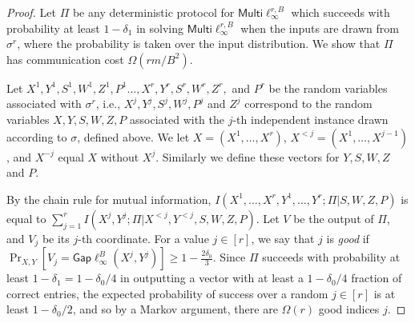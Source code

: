 \documentclass[twoside,leqno,twocolumn]{article}
\newcommand{\gaplinf}{\mathsf{Gap}\ell_{\infty}}
\newcommand{\multiLinf}{\mathsf{Multi}\ell_{\infty}}
\begin{document}
\begin{proof}
  Let $\Pi$ be any deterministic
  protocol for $\multiLinf^{r,B}$ which succeeds with probability at
  least $1-\delta_1$ in solving $\multiLinf^{r,B}$ when the inputs are
  drawn from $\sigma^r$, where the probability is taken over the input
  distribution. We show that $\Pi$ has communication cost
  $\Omega(rm/B^2)$.

  Let $X^1, Y^1, S^1, W^1, Z^1, P^1 \ldots, X^r, Y^r, S^r, W^r, Z^r,$ and $P^r$
  be the random variables associated with $\sigma^r$, i.e., 
  $X^j, Y^j, S^j, W^j, P^j$ and $Z^j$ correspond to the random variables
  $X, Y, S, W,Z,P$ associated with the $j$-th independent instance drawn
  according to $\sigma$, defined above. We let
  $X = (X^1, \ldots, X^r)$, $X^{< j} = (X^1, \ldots, X^{j-1})$, and
  $X^{-j}$ equal $X$ without $X^j$. Similarly we define these
  vectors for $Y, S, W, Z$ and $P$.
 
By the chain rule for mutual information, 
$I(X^1, \ldots, X^r, Y^1, \ldots, Y^r ; \Pi | S, W, Z, P)$
is equal to $\sum_{j=1}^r I(X^j, Y^j ; \Pi | X^{< j}, Y^{<j}, S, W, Z, P).$
Let $V$ be the output of $\Pi$, and $V_j$ be its $j$-th coordinate. 
For a value $j \in [r]$, we say that $j$ is {\it good} if
$\Pr_{X, Y}[V_j = \gaplinf^{B}(X^j, Y^j)] \geq 1-\frac{2\delta_0}{3}.$
Since $\Pi$ succeeds with probability at least $1-\delta_1 = 1-\delta_0/4$ in
outputting a vector with at least a $1-\delta_0/4$ fraction of
correct entries, the expected probability of success over a random $j \in [r]$
is at least $1-\delta_0/2$, and so by a
Markov argument, there are $\Omega(r)$ good indices $j$.


\end{proof}
\end{document}
